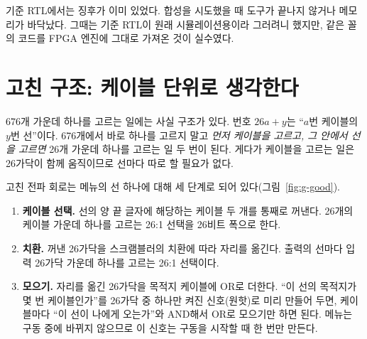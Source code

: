 기준 RTL에서는 징후가 이미 있었다. 합성을 시도했을 때 도구가 끝나지 않거나 메모리가 바닥났다. 그때는
기준 RTL이 원래 시뮬레이션용이라 그러려니 했지만, 같은 꼴의 코드를 FPGA 엔진에 그대로 가져온 것이 실수였다.

\section{고친 구조: 케이블 단위로 생각한다}

\Why 676개 가운데 하나를 고르는 일에는 사실 구조가 있다. 번호 $26a + y$는 ``$a$번 케이블의 $y$번 선''이다.
676개에서 바로 하나를 고르지 말고 \emph{먼저 케이블을 고르고, 그 안에서 선을 고르면} 26개 가운데 하나를
고르는 일 두 번이 된다. 게다가 케이블을 고르는 일은 26가닥이 함께 움직이므로 선마다 따로 할 필요가 없다.

고친 전파 회로는 메뉴의 선 하나에 대해 세 단계로 되어 있다(그림~\ref{fig:g-good}).

\begin{enumerate}
\item \textbf{케이블 선택.} 선의 양 끝 글자에 해당하는 케이블 두 개를 통째로 꺼낸다. 26개의 케이블 가운데
하나를 고르는 26:1 선택을 26비트 폭으로 한다.
\item \textbf{치환.} 꺼낸 26가닥을 스크램블러의 치환에 따라 자리를 옮긴다. 출력의 선마다 입력 26가닥
가운데 하나를 고르는 26:1 선택이다.
\item \textbf{모으기.} 자리를 옮긴 26가닥을 목적지 케이블에 OR로 더한다. ``이 선의 목적지가 몇 번
케이블인가''를 26가닥 중 하나만 켜진 신호(원핫)로 미리 만들어 두면, 케이블마다 ``이 선이 나에게 오는가''와
AND해서 OR로 모으기만 하면 된다. 메뉴는 구동 중에 바뀌지 않으므로 이 신호는 구동을 시작할 때 한 번만
만든다.
\end{enumerate}

